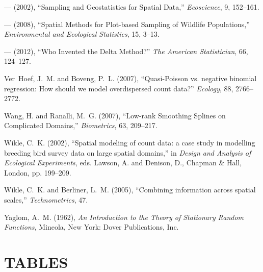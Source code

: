 \documentclass[12pt, titlepage]{article}\usepackage[]{graphicx}\usepackage[]{color}
\begin{document}
\begin{thebibliography}{47}
--- (2002), \enquote{Sampling and Geostatistics for Spatial Data,}
  \textit{Ecoscience}, 9, 152--161.

--- (2008), \enquote{Spatial Methods for Plot-based Sampling of Wildlife
  Populations,} \textit{Environmental and Ecological Statistics}, 15, 3--13.

--- (2012), \enquote{Who Invented the Delta Method?} \textit{The American
  Statistician}, 66, 124--127.

Ver~Hoef, J.~M. and Boveng, P.~L. (2007), \enquote{Quasi-Poisson vs. negative
  binomial regression: How should we model overdispersed count data?}
  \textit{Ecology}, 88, 2766--2772.

Wang, H. and Ranalli, M.~G. (2007), \enquote{Low-rank Smoothing Splines on
  Complicated Domains,} \textit{Biometrics}, 63, 209--217.

Wikle, C.~K. (2002), \enquote{Spatial modeling of count data: a case study in
  modelling breeding bird survey data on large spatial domains,} in
  \textit{Design and Analysis of Ecological Experiments}, eds. Lawson, A. and
  Denison, D., Chapman \& Hall, London, pp. 199--209.

Wikle, C.~K. and Berliner, L.~M. (2005), \enquote{Combining information across
  spatial scales,} \textit{Technometrics}, 47.

Yaglom, A.~M. (1962), \textit{An Introduction to the Theory of Stationary
  Random Functions}, Mineola, New York: Dover Publications, Inc.

\end{thebibliography}

\clearpage

\section*{TABLES}
\end{document}
